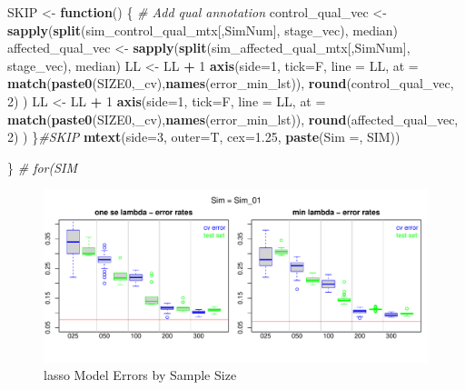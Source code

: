 \documentclass[
]{book}
\newenvironment{Shaded}{\begin{snugshade}}{\end{snugshade}}
\newcommand{\CommentTok}[1]{\textcolor[rgb]{0.56,0.35,0.01}{\textit{#1}}}
\newcommand{\ControlFlowTok}[1]{\textcolor[rgb]{0.13,0.29,0.53}{\textbf{#1}}}
\newcommand{\DataTypeTok}[1]{\textcolor[rgb]{0.13,0.29,0.53}{#1}}
\newcommand{\DecValTok}[1]{\textcolor[rgb]{0.00,0.00,0.81}{#1}}
\newcommand{\FloatTok}[1]{\textcolor[rgb]{0.00,0.00,0.81}{#1}}
\newcommand{\KeywordTok}[1]{\textcolor[rgb]{0.13,0.29,0.53}{\textbf{#1}}}
\newcommand{\NormalTok}[1]{#1}
\newcommand{\OperatorTok}[1]{\textcolor[rgb]{0.81,0.36,0.00}{\textbf{#1}}}
\newcommand{\StringTok}[1]{\textcolor[rgb]{0.31,0.60,0.02}{#1}}
\begin{document}
\begin{Shaded}
\begin{Highlighting}[]
\NormalTok{SKIP  <{-}}\StringTok{ }\ControlFlowTok{function}\NormalTok{() \{}
\CommentTok{\# Add qual annotation}
\NormalTok{control\_qual\_vec <{-}}\StringTok{ }\KeywordTok{sapply}\NormalTok{(}\KeywordTok{split}\NormalTok{(sim\_control\_qual\_mtx[,SimNum], stage\_vec), median)}
\NormalTok{affected\_qual\_vec <{-}}\StringTok{ }\KeywordTok{sapply}\NormalTok{(}\KeywordTok{split}\NormalTok{(sim\_affected\_qual\_mtx[,SimNum], stage\_vec), median)}
\NormalTok{LL <{-}}\StringTok{ }\NormalTok{LL }\OperatorTok{+}\StringTok{ }\DecValTok{1}
\KeywordTok{axis}\NormalTok{(}\DataTypeTok{side=}\DecValTok{1}\NormalTok{, }\DataTypeTok{tick=}\NormalTok{F, }\DataTypeTok{line =}\NormalTok{ LL,}
  \DataTypeTok{at =} \KeywordTok{match}\NormalTok{(}\KeywordTok{paste0}\NormalTok{(SIZE0,}\StringTok{\textquotesingle{}\_cv\textquotesingle{}}\NormalTok{),}\KeywordTok{names}\NormalTok{(error\_min\_lst)),}
  \KeywordTok{round}\NormalTok{(control\_qual\_vec, }\DecValTok{2}\NormalTok{)}
\NormalTok{ )}
\NormalTok{LL <{-}}\StringTok{ }\NormalTok{LL }\OperatorTok{+}\StringTok{ }\DecValTok{1}
\KeywordTok{axis}\NormalTok{(}\DataTypeTok{side=}\DecValTok{1}\NormalTok{, }\DataTypeTok{tick=}\NormalTok{F, }\DataTypeTok{line =}\NormalTok{ LL,}
  \DataTypeTok{at =} \KeywordTok{match}\NormalTok{(}\KeywordTok{paste0}\NormalTok{(SIZE0,}\StringTok{\textquotesingle{}\_cv\textquotesingle{}}\NormalTok{),}\KeywordTok{names}\NormalTok{(error\_min\_lst)),}
  \KeywordTok{round}\NormalTok{(affected\_qual\_vec, }\DecValTok{2}\NormalTok{)}
\NormalTok{ )}
\NormalTok{\}}\CommentTok{\#SKIP}
\KeywordTok{mtext}\NormalTok{(}\DataTypeTok{side=}\DecValTok{3}\NormalTok{, }\DataTypeTok{outer=}\NormalTok{T, }\DataTypeTok{cex=}\FloatTok{1.25}\NormalTok{, }\KeywordTok{paste}\NormalTok{(}\StringTok{\textquotesingle{}Sim =\textquotesingle{}}\NormalTok{,  SIM))}

\NormalTok{\} }\CommentTok{\# for(SIM}
\end{Highlighting}
\end{Shaded}

\begin{figure}
\centering
\includegraphics{Static/figures/hcc5hmC-glmnetSuite-lasso-simRes-errors-bySim-1.pdf}
\caption{\label{fig:hcc5hmC-glmnetSuite-lasso-simRes-errors-bySim}lasso Model Errors by Sample Size}
\end{figure}
\end{document}
